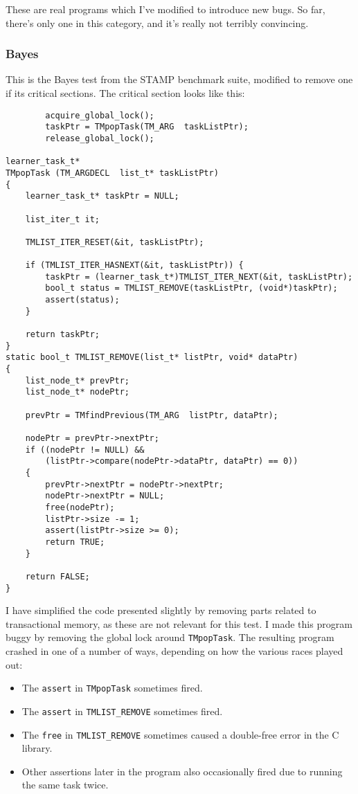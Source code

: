 These are real programs which I've modified to introduce new bugs.  So
far, there's only one in this category, and it's really not terribly
convincing.

\subsubsection{Bayes}

This is the Bayes test from the STAMP benchmark suite, modified to
remove one if its critical sections.  The critical section looks like
this:

\begin{verbatim}
        acquire_global_lock();
        taskPtr = TMpopTask(TM_ARG  taskListPtr);
        release_global_lock();

learner_task_t*
TMpopTask (TM_ARGDECL  list_t* taskListPtr)
{
    learner_task_t* taskPtr = NULL;

    list_iter_t it;

    TMLIST_ITER_RESET(&it, taskListPtr);

    if (TMLIST_ITER_HASNEXT(&it, taskListPtr)) {
        taskPtr = (learner_task_t*)TMLIST_ITER_NEXT(&it, taskListPtr);
        bool_t status = TMLIST_REMOVE(taskListPtr, (void*)taskPtr);
        assert(status);
    }

    return taskPtr;
}
static bool_t TMLIST_REMOVE(list_t* listPtr, void* dataPtr)
{
    list_node_t* prevPtr;
    list_node_t* nodePtr;

    prevPtr = TMfindPrevious(TM_ARG  listPtr, dataPtr);

    nodePtr = prevPtr->nextPtr;
    if ((nodePtr != NULL) &&
        (listPtr->compare(nodePtr->dataPtr, dataPtr) == 0))
    {
        prevPtr->nextPtr = nodePtr->nextPtr;
        nodePtr->nextPtr = NULL;
        free(nodePtr);
        listPtr->size -= 1;
        assert(listPtr->size >= 0);
        return TRUE;
    }

    return FALSE;
}
\end{verbatim}

I have simplified the code presented slightly by removing parts
related to transactional memory, as these are not relevant for this
test.  I made this program buggy by removing the global lock around
\verb|TMpopTask|.  The resulting program crashed in one of a number of
ways, depending on how the various races played out:

\begin{itemize}
\item The \verb|assert| in \verb|TMpopTask| sometimes fired.
\item The \verb|assert| in \verb|TMLIST_REMOVE| sometimes fired.
\item The \verb|free| in \verb|TMLIST_REMOVE| sometimes caused a
  double-free error in the C library.
\item Other assertions later in the program also occasionally fired
  due to running the same task twice.
\end{itemize}

